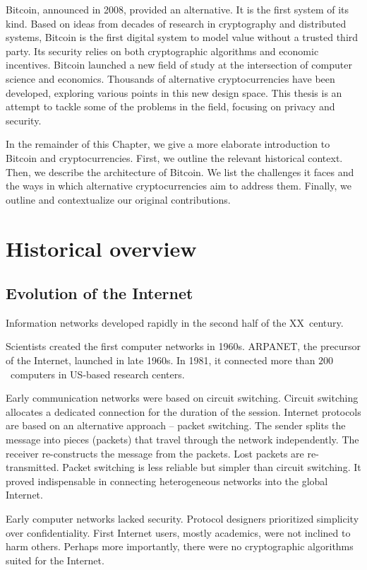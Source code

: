 Bitcoin, announced in 2008, provided an alternative.
It is the first system of its kind.
Based on ideas from decades of research in cryptography and distributed systems, Bitcoin is the first digital system to model value without a trusted third party.
Its security relies on both cryptographic algorithms and economic incentives.
Bitcoin launched a new field of study at the intersection of computer science and economics.
Thousands of alternative cryptocurrencies have been developed, exploring various points in this new design space.
This thesis is an attempt to tackle some of the problems in the field, focusing on privacy and security.

In the remainder of this Chapter, we give a more elaborate introduction to Bitcoin and cryptocurrencies.
First, we outline the relevant historical context.
Then, we describe the architecture of Bitcoin.
We list the challenges it faces and the ways in which alternative cryptocurrencies aim to address them.
Finally, we outline and contextualize our original contributions.


\section{Historical overview}


\subsection{Evolution of the Internet}

Information networks developed rapidly in the second half of the XX~century.

Scientists created the first computer networks in 1960s.
ARPANET, the precursor of the Internet, launched in late 1960s.
In 1981, it connected more than $200$~computers in US-based research centers.

Early communication networks were based on circuit switching.
Circuit switching allocates a dedicated connection for the duration of the session.
Internet protocols are based on an alternative approach -- packet switching.
The sender splits the message into pieces (packets) that travel through the network independently.
The receiver re-constructs the message from the packets.
Lost packets are re-transmitted.
Packet switching is less reliable but simpler than circuit switching.
It proved indispensable in connecting heterogeneous networks into the global Internet.

Early computer networks lacked security.
Protocol designers prioritized simplicity over confidentiality.
First Internet users, mostly academics, were not inclined to harm others.
Perhaps more importantly, there were no cryptographic algorithms suited for the Internet.

